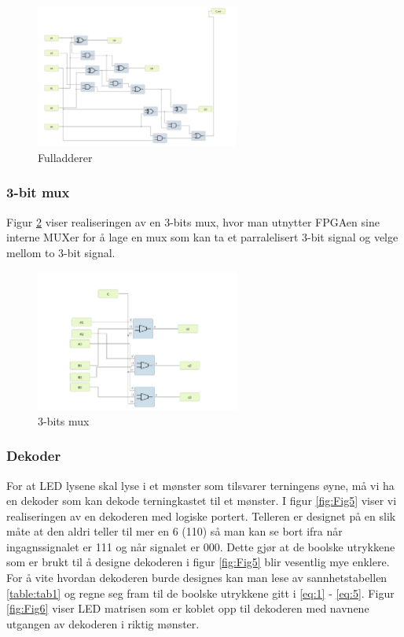 \begin{figure}[H]
  \centering
  \includegraphics[width=0.6\textwidth]{Bilder/3-bit_adderer.png} 
  \caption{Fulladderer}
  \label{fig:Fig3}
\end{figure}

\subsubsection[Mux]{3-bit mux}
Figur \ref{fig:Fig4} viser realiseringen av en 3-bits mux, hvor man utnytter FPGAen sine interne MUXer for å lage en mux som kan ta et parralelisert 3-bit signal og velge mellom to 3-bit signal.

\begin{figure}[H]
  \centering
  \includegraphics[width=0.6\textwidth]{Bilder/3-bit_MUX.png} 
  \caption{3-bits mux}
  \label{fig:Fig4}
\end{figure}

\subsubsection[Dekoder]{Dekoder}
For at LED lysene skal lyse i et mønster som tilsvarer terningens øyne, må vi ha en dekoder som kan dekode terningkastet til et mønster. I figur \ref{fig:Fig5} viser vi realiseringen av en dekoderen med logiske portert. Telleren er designet på en slik måte at den aldri teller til mer en 6 (110) så man kan se bort ifra når ingagnssignalet er 111 og når signalet er 000. Dette gjør at de boolske utrykkene som er brukt til å designe dekoderen i figur \ref*{fig:Fig5} blir vesentlig mye enklere. For å vite hvordan dekoderen burde designes kan man lese av sannhetstabellen \ref{table:tab1} og regne seg fram til de boolske utrykkene gitt i \ref{eq:1} - \ref{eq:5}. Figur \ref{fig:Fig6} viser LED matrisen som er koblet opp til dekoderen med navnene utgangen av dekoderen i riktig mønster.

